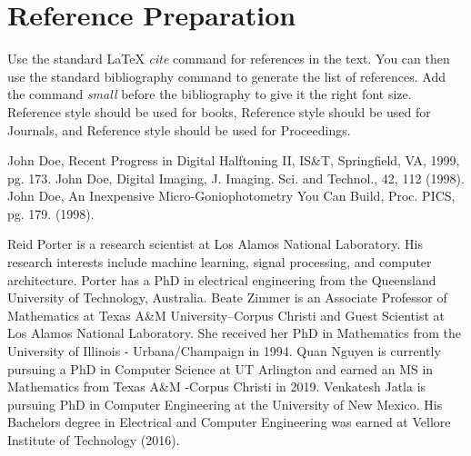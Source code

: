 \documentclass[letterpaper,twocolumn,fleqn]{article}
\begin{document}

\section{Reference Preparation}
Use the standard LaTeX \emph{cite} command for references in the
text. You can then use the standard bibliography command to generate
the list of references. Add the command \emph{small} before the
bibliography to give it the right font size.  Reference \cite{bib1}
style should be used for books, Reference \cite{bib2} style should be
used for Journals, and Reference \cite{bib3} style should be used for
Proceedings.




\small
\begin{thebibliography}{9}
John Doe, Recent Progress in Digital Halftoning II,
  IS\&T, Springfield, VA, 1999, pg. 173.
John Doe, Digital Imaging, J. Imaging. Sci. and
  Technol., 42, 112 (1998).
John Doe, An Inexpensive Micro-Goniophotometry You Can
  Build, Proc. PICS, pg. 179. (1998).
\end{thebibliography}


\begin{biography}


Reid Porter is a research scientist at Los Alamos National Laboratory. His research interests include machine learning, signal processing, and computer architecture. Porter has a PhD in electrical engineering from the Queensland University of Technology, Australia.
Beate Zimmer is an Associate Professor of Mathematics at Texas A\&M University--Corpus Christi and Guest Scientist at Los Alamos National Laboratory. She received her PhD in Mathematics from the University of Illinois - Urbana/Champaign in 1994.
Quan Nguyen is currently pursuing a PhD in Computer Science at UT Arlington and earned an MS in Mathematics from Texas A\&M -Corpus Christi  in 2019.
Venkatesh Jatla is pursuing PhD in Computer Engineering at the University of New Mexico. His Bachelors degree in Electrical and Computer Engineering was earned at Vellore Institute of Technology (2016).
\end{biography}
\end{document}
